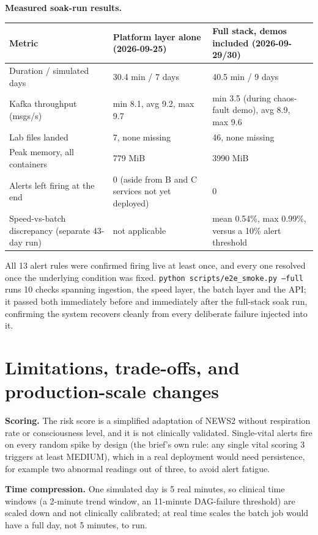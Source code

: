 \documentclass[11pt,a4paper]{article}
\newcommand{\code}[1]{\texttt{\small #1}}
\begin{document}
\textbf{Measured soak-run results.}

\begin{longtable}{@{}L{4.7cm}L{4.5cm}L{5cm}@{}}
\toprule
\textbf{Metric} & \textbf{Platform layer alone (2026-09-25)} & \textbf{Full stack, demos included (2026-09-29/30)} \\
\midrule
\endhead
Duration / simulated days & 30.4 min / 7 days & 40.5 min / 9 days \\
Kafka throughput (msgs/s) & min 8.1, avg 9.2, max 9.7 & min 3.5 (during chaos-fault demo), avg 8.9, max 9.6 \\
Lab files landed & 7, none missing & 46, none missing \\
Peak memory, all containers & 779 MiB & 3990 MiB \\
Alerts left firing at the end & 0 (aside from B and C services not yet deployed) & 0 \\
Speed-vs-batch discrepancy (separate 43-day run) & not applicable & mean 0.54\%, max 0.99\%, versus a 10\% alert threshold \\
\bottomrule
\end{longtable}

All 13 alert rules were confirmed firing live at least once, and every one resolved once the
underlying condition was fixed. \code{python scripts/e2e\_smoke.py --full} runs 10 checks spanning
ingestion, the speed layer, the batch layer and the API; it passed both immediately before and
immediately after the full-stack soak run, confirming the system recovers cleanly from every
deliberate failure injected into it.

\section{Limitations, trade-offs, and production-scale changes}

\textbf{Scoring.} The risk score is a simplified adaptation of NEWS2 without respiration rate or
consciousness level, and it is not clinically validated. Single-vital alerts fire on every random
spike by design (the brief's own rule: any single vital scoring 3 triggers at least MEDIUM), which in
a real deployment would need persistence, for example two abnormal readings out of three, to avoid
alert fatigue.

\textbf{Time compression.} One simulated day is 5 real minutes, so clinical time windows (a 2-minute
trend window, an 11-minute DAG-failure threshold) are scaled down and not clinically calibrated; at
real time scales the batch job would have a full day, not 5 minutes, to run.
\end{document}
